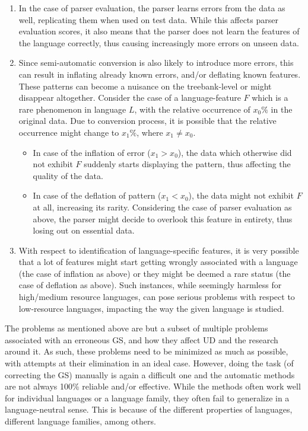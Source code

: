 \begin{enumerate}
    \item In the case of parser evaluation, the parser learns errors from the data as well, replicating them when used on test data. While this affects parser evaluation scores, it also means that the parser does not learn the features of the language correctly, thus causing increasingly more errors on unseen data.
    \item Since semi-automatic conversion is also likely to introduce more errors, this can result in inflating already known errors, and/or deflating known features. These patterns can become a nuisance on the treebank-level or might disappear altogether. Consider the case of a language-feature \(F\) which is a rare phenomenon in language \(L\), with the relative occurrence of \(x_0 \%\) in the original data. Due to conversion process, it is possible that the relative occurrence might change to \(x_1 \%\), where \(x_1 \neq x_0\).
    \begin{itemize}
        \item In case of the inflation of error (\(x_1 > x_0\)), the data which otherwise did not exhibit \(F\) suddenly starts displaying the pattern, thus affecting the quality of the data.
        \item In case of the deflation of pattern (\(x_1 < x_0\)), the data might not exhibit \(F\) at all, increasing its rarity. Considering the case of parser evaluation as above, the parser might decide to overlook this feature in entirety, thus losing out on essential data.
    \end{itemize}
    \item With respect to identification of language-specific features, it is very possible that a lot of features might start getting wrongly associated with a language (the case of inflation as above) or they might be deemed a rare status (the case of deflation as above). Such instances, while seemingly harmless for high/medium resource languages, can pose serious problems with respect to low-resource languages, impacting the way the given language is studied.
\end{enumerate}

The problems as mentioned above are but a subset of multiple problems associated with an erroneous GS, and how they affect UD and the research around it. As such, these problems need to be minimized as much as possible, with attempts at their elimination in an ideal case. However, doing the task (of correcting the GS) manually is again a difficult one and the automatic methods are not always 100\% reliable and/or effective. While the methods often work well for individual languages or a language family, they often fail to generalize in a language-neutral sense. This is because of the different properties of languages, different language families, among others.

